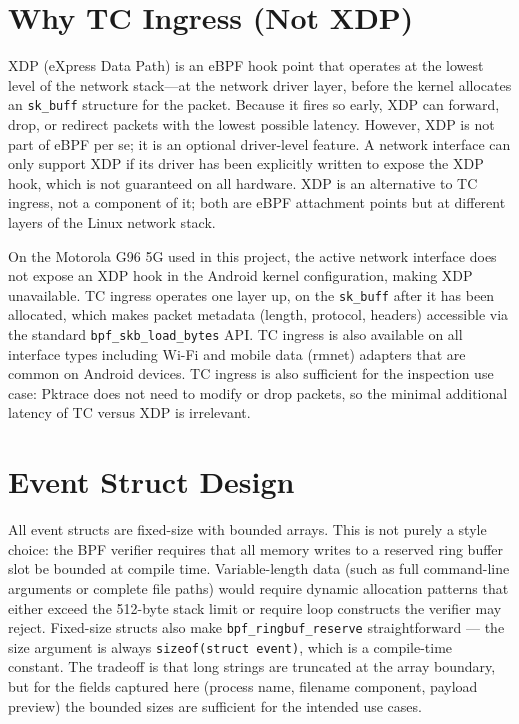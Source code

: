 \documentclass{mnitjaipur}
\begin{document}
\section{Why TC Ingress (Not XDP)}
XDP (eXpress Data Path) is an eBPF hook point that operates at the lowest level of the network stack---at the network driver layer, before the kernel allocates an \texttt{sk\_buff} structure for the packet. Because it fires so early, XDP can forward, drop, or redirect packets with the lowest possible latency. However, XDP is not part of eBPF per se; it is an optional driver-level feature. A network interface can only support XDP if its driver has been explicitly written to expose the XDP hook, which is not guaranteed on all hardware. XDP is an alternative to TC ingress, not a component of it; both are eBPF attachment points but at different layers of the Linux network stack.

On the Motorola G96 5G used in this project, the active network interface does not expose an XDP hook in the Android kernel configuration, making XDP unavailable. TC ingress operates one layer up, on the \texttt{sk\_buff} after it has been allocated, which makes packet metadata (length, protocol, headers) accessible via the standard \texttt{bpf\_skb\_load\_bytes} API. TC ingress is also available on all interface types including Wi-Fi and mobile data (rmnet) adapters that are common on Android devices. TC ingress is also sufficient for the inspection use case: Pktrace does not need to modify or drop packets, so the minimal additional latency of TC versus XDP is irrelevant.

\section{Event Struct Design}
All event structs are fixed-size with bounded arrays. This is not purely a style choice: the BPF verifier requires that all memory writes to a reserved ring buffer slot be bounded at compile time. Variable-length data (such as full command-line arguments or complete file paths) would require dynamic allocation patterns that either exceed the 512-byte stack limit or require loop constructs the verifier may reject. Fixed-size structs also make \texttt{bpf\_ringbuf\_reserve} straightforward — the size argument is always \texttt{sizeof(struct event)}, which is a compile-time constant. The tradeoff is that long strings are truncated at the array boundary, but for the fields captured here (process name, filename component, payload preview) the bounded sizes are sufficient for the intended use cases.
\end{document}
